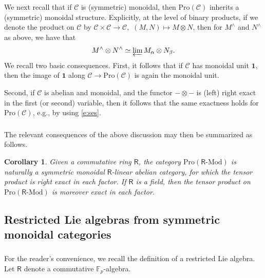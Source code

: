 \documentclass{amsart}
\newtheorem{Cor}[Thm]{Corollary}
\theoremstyle{definition}
\newcommand{\Promod}{\on{Pro}(\Ring\mod)}
\newcommand{\sC}{\mathscr{C}}
\newcommand{\Proc}{\on{Pro}(\sC)}
\newcommand{\Pro}{\on{Pro}}
\newcommand{\sss}{\subsubsection{}}
\renewcommand{\mod}{\text{-}\on{Mod}}
\newcommand{\on}{\mathrm}
\newcommand{\Ring}{\mathsf{R}}
\numberwithin{equation}{section}
\begin{document}
\sss We next recall that if $\sC$ is (symmetric) monoidal, then $\Pro(\sC)$ inherits a (symmetric) monoidal structure. Explicitly, at the level of binary products, if we denote the product on $\sC$ by $\sC \times \sC \rightarrow \sC,$ $(M, N) \mapsto M \otimes N$, then for $M^\wedge$ and $N^\wedge$ as above, we have that $$M^\wedge \otimes N^\wedge \simeq \varprojlim M_\alpha \otimes N_\beta.$$We recall two basic consequences. First, it follows that if $\sC$ has monoidal unit $\mathbf{1}$, then the image of $\mathbf{1}$ along $\sC \rightarrow \Proc$ is again the monoidal unit.

Second, if $\sC$ is abelian and monoidal, and the functor $- \otimes - $ is (left) right exact in the first (or second) variable, then it follows that the same exactness holds for $\Proc$, e.g., by using \eqref{e:ses}. 

\sss The relevant consequences of the above discussion may then be summarized as follows. 

\begin{Cor}Given a commutative ring $\Ring$, the category $\Promod$ is naturally a symmetric monoidal $\Ring$-linear abelian category, for which the tensor product is right exact in each factor. If $\Ring$ is a field, then the tensor product on $\Promod$ is moreover exact in each factor. 
\end{Cor} 

\subsection{Restricted Lie algebras from symmetric monoidal categories}
\label{ss:restrI}

\sss\label{SSS_restricted_Lie} For the reader's convenience, we recall the definition of a restricted Lie algebra. Let $\Ring$ denote a commutative $\mathbb{F}_p$-algebra. 
\end{document}
